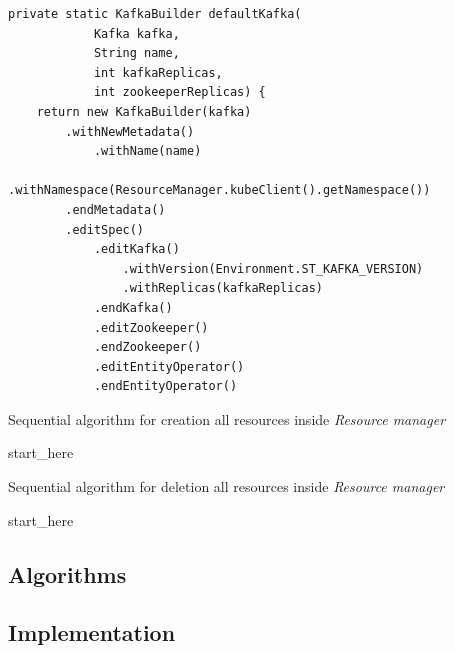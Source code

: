 \begin{verbatim}
private static KafkaBuilder defaultKafka(
            Kafka kafka,
            String name,
            int kafkaReplicas,
            int zookeeperReplicas) {
    return new KafkaBuilder(kafka)
        .withNewMetadata()
            .withName(name)
            .withNamespace(ResourceManager.kubeClient().getNamespace())
        .endMetadata()
        .editSpec()
            .editKafka()
                .withVersion(Environment.ST_KAFKA_VERSION)
                .withReplicas(kafkaReplicas)
            .endKafka()
            .editZookeeper()
            .endZookeeper()
            .editEntityOperator()
            .endEntityOperator()
\end{verbatim}

\begin{algorithm}[H]
    \label{01:alg:dsds}
    \caption{Sequential algorithm for creation all resources inside \emph{Resource manager}}

    \begin{algorithmic}[1]
        \State start\_here
    \end{algorithmic} 
\end{algorithm}


\begin{algorithm}[H]
    \label{01:alg:dsdsd+}
    \caption{Sequential algorithm for deletion all resources inside \emph{Resource manager}}

    \begin{algorithmic}[1]
        \State start\_here
    \end{algorithmic}
\end{algorithm}

\subsection{Algorithms}
\label{02:subsec:strimzisystemtest:algorithms}


\subsection*{Implementation}